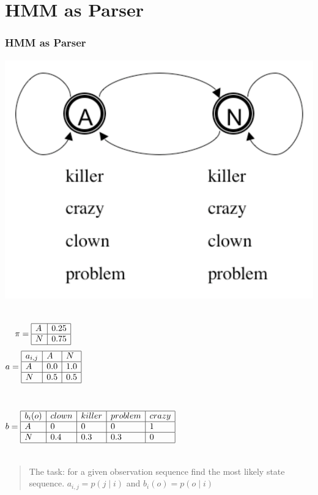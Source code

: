 \section{HMM as Parser}

\begin{frame}
\frametitle{HMM as Parser}
\begin{center}
\includegraphics[scale=.25]{figures/hmmfig2}
\end{center}
{\color{blue}
\begin{center}
\begin{columns}[c]
\column{0.5in}
\[ \pi = \begin{array}{|l|l|}
\hline
A & 0.25 \\ \hline
N & 0.75 \\ \hline
\end{array}
\]
\pause
\column{0.65in}
\[ a = \begin{array}{|l|l|l|}
\hline
a_{i,j} & A & N \\ \hline
A & 0.0 & 1.0 \\ \hline
N & 0.5 & 0.5 \\ \hline
\end{array}
\]
\end{columns}
\pause
\begin{columns}[c]
\column{3in}
\[ b = \begin{array}{|l|l|l|l|l|}
\hline
b_i(o) & clown & killer & problem & crazy \\ \hline
A & 0 & 0 & 0 & 1 \\ \hline
N & 0.4 & 0.3 & 0.3 & 0 \\ \hline
\end{array}
\]
\end{columns}
\end{center}
}
\pause
\begin{quote}
The task: for a given observation sequence find the most likely state sequence.
$a_{i,j} = p(j \mid i)$ and $b_i(o) = p(o \mid i)$
\end{quote}
\end{frame}

